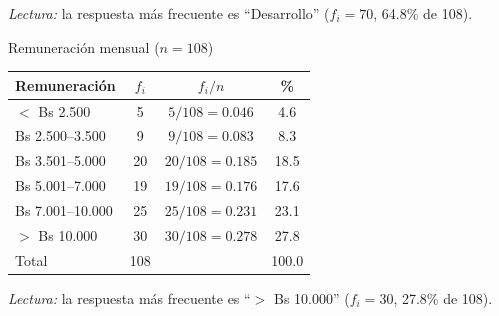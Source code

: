 \textit{Lectura:} la respuesta más frecuente es ``Desarrollo'' ($f_i = 70$, 64.8\% de 108).

\begin{mitabla}{Remuneración mensual ($n=108$)}
\begin{tabular}{lccc}
\toprule
Remuneración & $f_i$ & $f_i / n$ & \% \\
\midrule
$<$ Bs 2.500 & 5 & $5/108 = 0.046$ & 4.6 \\
Bs 2.500–3.500 & 9 & $9/108 = 0.083$ & 8.3 \\
Bs 3.501–5.000 & 20 & $20/108 = 0.185$ & 18.5 \\
Bs 5.001–7.000 & 19 & $19/108 = 0.176$ & 17.6 \\
Bs 7.001–10.000 & 25 & $25/108 = 0.231$ & 23.1 \\
$>$ Bs 10.000 & 30 & $30/108 = 0.278$ & 27.8 \\
\midrule
Total & 108 & & 100.0 \\
\bottomrule
\end{tabular}
\end{mitabla}

\textit{Lectura:} la respuesta más frecuente es ``$>$ Bs 10.000'' ($f_i = 30$, 27.8\% de 108).

